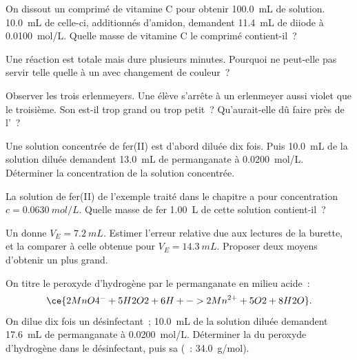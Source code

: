 \begin{exercise}[$\star\star$]\label{exo:g11:titration:7}
On dissout un comprimé de vitamine C pour obtenir \qty{100.0}{mL} de
solution. \qty{10.0}{mL} de celle-ci, additionnés d'amidon, demandent
\qty{11.4}{mL} de diiode à \qty{0.0100}{mol/L}. Quelle masse de
vitamine C le comprimé contient-il~?
\end{exercise}

\begin{exercise}[$\star\star$]\label{exo:g11:titration:8}
Une réaction est totale mais dure plusieurs minutes. Pourquoi ne
peut-elle pas servir telle quelle à un  avec changement de
couleur~?
\end{exercise}

\begin{exercise}[$\star\star$]\label{exo:g11:titration:9}
Observer les trois erlenmeyers. Une élève s'arrête à un erlenmeyer aussi
violet que le troisième. Son  est-il trop grand ou
trop petit~? Qu'aurait-elle dû faire près de l'~?
\end{exercise}

\begin{exercise}[$\star\star$]\label{exo:g11:titration:10}
Une solution concentrée de fer(II) est d'abord diluée dix fois. Puis
\qty{10.0}{mL} de la solution diluée demandent \qty{13.0}{mL} de
permanganate à \qty{0.0200}{mol/L}. Déterminer la concentration de la
solution concentrée.
\end{exercise}

\begin{exercise}[$\star\star$]\label{exo:g11:titration:11}
La solution de fer(II) de l'exemple traité dans le chapitre a pour
concentration $c = \qty{0.0630}{mol/L}$. Quelle masse de fer
\qty{1.00}{L} de cette solution contient-il~?
\end{exercise}

\begin{exercise}[$\star\star\star$]\label{exo:g11:titration:12}
Un  donne $V_E = \qty{7.2}{mL}$. Estimer l'erreur relative due
aux lectures de la burette, et la comparer à celle obtenue pour
$V_E = \qty{14.3}{mL}$. Proposer deux moyens d'obtenir un  plus grand.
\end{exercise}

\begin{exercise}[$\star\star\star$]\label{exo:g11:titration:13}
On titre le peroxyde d'hydrogène par le permanganate en milieu acide~:
\[
  \ce{2MnO4^- + 5H2O2 + 6H+ -> 2Mn^{2+} + 5O2 + 8H2O} .
\]
On dilue dix fois un désinfectant~; \qty{10.0}{mL} de la solution diluée
demandent \qty{17.6}{mL} de permanganate à \qty{0.0200}{mol/L}.
Déterminer la  du peroxyde d'hydrogène dans le
désinfectant, puis sa  (~:
\qty{34.0}{g/mol}).
\end{exercise}

